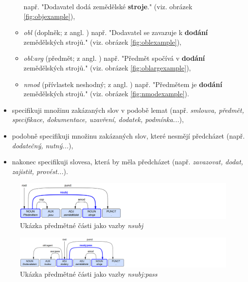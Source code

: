 \documentclass[thesis=M,czech]{FITthesis}[2019/12/23]
\begin{document}
\begin{itemize}
\begin{itemize}
        např. "Dodavatel dodá zemědělské \textbf{stroje}."\newline
        (viz. obrázek \ref{fig:objexample}),
        \item \textit{obl} (doplněk; z angl. )\newline
        např. "Dodavatel se zavazuje k \textbf{dodání} zemědělských strojů."\newline
        (viz. obrázek \ref{fig:oblexample}),
        \item \textit{obl:arg} (předmět; z angl. )\newline
        např. "Předmět spočívá v \textbf{dodání} zemědělských strojů."\newline
        (viz. obrázek \ref{fig:oblargexample}),
        \item \textit{nmod} (přívlastek neshodný; z angl. )\newline
        např. "Předmětem je \textbf{dodání} zemědělských strojů."\newline
        (viz. obrázek \ref{fig:nmodexample}).
    \end{itemize}
    \item specifikuji množinu zakázaných slov v podobě lemat (např. \textit{smlouva, předmět, specifikace, dokumentace, uzavření, dodatek, podmínka...}),
    \item podobně specifikuji množinu zakázaných slov, které nesmějí předcházet (např. \textit{dodatečný, nutný...}),
    \item nakonec specifikuji slovesa, která by měla předcházet (např. \textit{zavazovat, dodat, zajistit, provést...}).
\end{itemize}

\begin{figure}\centering
	\includegraphics[width=1\textwidth]{images/nsubj_example.png}
	\caption{Ukázka předmětné části jako vazby \textit{nsubj}}\label{fig:nsubjexample}
\end{figure}

\begin{figure}\centering
	\includegraphics[width=1\textwidth]{images/nsubjpass_example.png}
	\caption{Ukázka předmětné části jako vazby \textit{nsubj:pass}}\label{fig:nsubjpassexample}
\end{figure}
\end{document}
